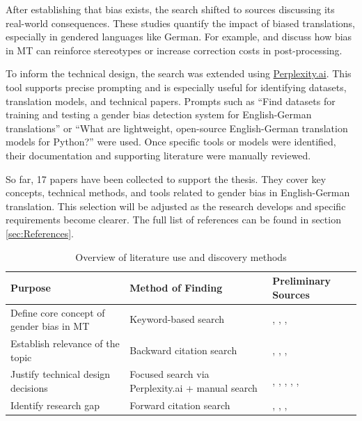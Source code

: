 \begin{description}
After establishing that bias exists, the search shifted to sources discussing its real-world consequences. These studies quantify the impact of biased translations, especially in gendered languages like German. For example, \textcite{savoldi_what_2024} and \textcite{bolukbasi_man_2016} discuss how bias in MT can reinforce stereotypes or increase correction costs in post-processing.

To inform the technical design, the search was extended using \href{https://www.perplexity.ai/}{Perplexity.ai}. This tool supports precise prompting and is especially useful for identifying datasets, translation models, and technical papers. Prompts such as “Find datasets for training and testing a gender bias detection system for English-German translations” or “What are lightweight, open-source English-German translation models for Python?” were used. Once specific tools or models were identified, their documentation and supporting literature were manually reviewed.

So far, 17 papers have been collected to support the thesis. They cover key concepts, technical methods, and tools related to gender bias in English-German translation. This selection will be adjusted as the research develops and specific requirements become clearer. The full list of references can be found in section \ref{sec:References}.

\begin{table}[h!]
\centering
\renewcommand{\arraystretch}{1.3}
\begin{tabularx}{\textwidth}{|X|X|X|}
\hline
\textbf{Purpose} & \textbf{Method of Finding} & \textbf{Preliminary Sources} \\
\hline
Define core concept of gender bias in MT & Keyword-based search & \textcite{prates_assessing_2019}, \textcite{stanovsky_evaluating_2019}, \textcite{cho_measuring_2019}, \textcite{shrestha_exploring_2022} \\
\hline
Establish relevance of the topic & Backward citation search & \textcite{bolukbasi_man_2016}, \textcite{savoldi_what_2024}, \textcite{godsil_effects_2016}, \textcite{braccini_does_2024} \\
\hline
Justify technical design decisions & Focused search via Perplexity.ai + manual search & \textcite{devlin_bert_2019}, \textcite{lardelli_building_2024}, \textcite{tiedemann_opus-mt_2020}, \textcite{stella_dataset_2021}, \textcite{savoldi_mgente_2025}, \textcite{papineni_bleu_2001} \\
\hline
Identify research gap & Forward citation search & \textcite{lardelli_building_2024}, \textcite{gete_does_2024}, \textcite{kappl_are_2025}, \textcite{unior_nlp_research_group_university_of_naples__gender_2023} \\
\hline
\end{tabularx}
\caption{Overview of literature use and discovery methods}
\label{tab:overview_literature}
\end{table}


\end{description}
